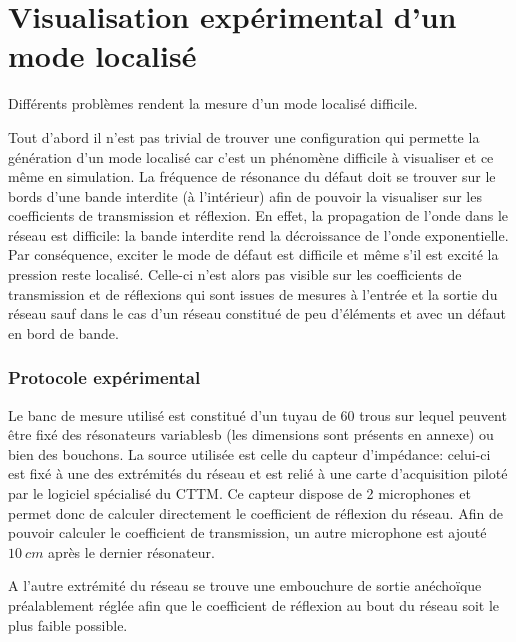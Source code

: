 \chapter{Visualisation expérimental d'un mode localisé}
Différents problèmes rendent la mesure d'un mode localisé difficile.

Tout d'abord il n'est pas trivial de trouver une configuration qui permette la génération d'un mode localisé car c'est un phénomène difficile à visualiser et ce même en simulation. La fréquence de résonance du défaut doit se trouver sur le bords d'une bande interdite (à l'intérieur) afin de pouvoir la visualiser sur les coefficients de transmission et réflexion. En effet, la propagation de l'onde dans le réseau est difficile: la bande interdite rend la décroissance de l'onde exponentielle. Par conséquence, exciter le mode de défaut est difficile et même s'il est excité la pression reste localisé. Celle-ci n'est alors pas visible sur les coefficients de transmission et de réflexions qui sont issues de mesures à l'entrée et la sortie du réseau sauf dans le cas d'un réseau constitué de peu d’éléments et avec un défaut en bord de bande.


\subsection{Protocole expérimental}
Le banc de mesure utilisé est constitué d'un tuyau de 60 trous sur lequel peuvent être fixé des résonateurs variablesb (les dimensions sont présents en annexe) ou bien des bouchons. La source utilisée est celle du capteur d'impédance: celui-ci est fixé à une des extrémités du réseau et est relié à une carte d'acquisition piloté par le logiciel spécialisé du CTTM. Ce capteur dispose de 2 microphones et permet donc de calculer directement le coefficient de réflexion du réseau. Afin de pouvoir calculer le coefficient de transmission, un autre microphone est ajouté $10~cm$ après le dernier résonateur.

\bigskip

A l'autre extrémité du réseau se trouve une embouchure de sortie anéchoïque préalablement réglée afin que le coefficient de réflexion au bout du réseau soit le plus faible possible.


